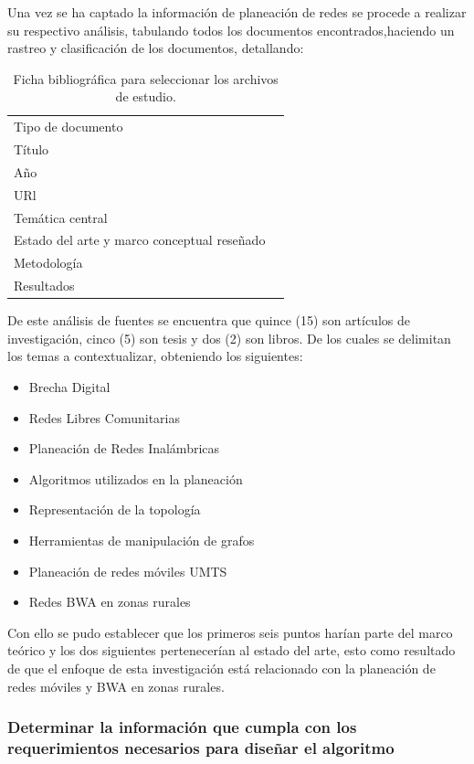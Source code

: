 \documentclass[]{article}
\providecommand{\tightlist}{%
  \setlength{\itemsep}{0pt}\setlength{\parskip}{0pt}}
\begin{document}
Una vez se ha captado la información de planeación de redes se procede a
realizar su respectivo análisis, tabulando todos los documentos
encontrados,haciendo un rastreo y clasificación de los documentos,
detallando:

\begin{longtable}[]{@{}ll@{}}
\caption{Ficha bibliográfica para seleccionar los archivos de
estudio.}\tabularnewline
\toprule
Tipo de documento &\tabularnewline
Título &\tabularnewline
Año &\tabularnewline
URl &\tabularnewline
Temática central &\tabularnewline
Estado del arte y marco conceptual reseñado &\tabularnewline
Metodología &\tabularnewline
Resultados &\tabularnewline
\bottomrule
\end{longtable}

De este análisis de fuentes se encuentra que quince (15) son artículos
de investigación, cinco (5) son tesis y dos (2) son libros. De los
cuales se delimitan los temas a contextualizar, obteniendo los
siguientes:

\begin{itemize}
\tightlist
\item
  Brecha Digital
\item
  Redes Libres Comunitarias
\item
  Planeación de Redes Inalámbricas
\item
  Algoritmos utilizados en la planeación
\item
  Representación de la topología
\item
  Herramientas de manipulación de grafos
\item
  Planeación de redes móviles UMTS
\item
  Redes BWA en zonas rurales
\end{itemize}

Con ello se pudo establecer que los primeros seis puntos harían parte
del marco teórico y los dos siguientes pertenecerían al estado del arte,
esto como resultado de que el enfoque de esta investigación está
relacionado con la planeación de redes móviles y BWA en zonas rurales.

\subsubsection{\texorpdfstring{\textbf{Determinar la información que
cumpla con los requerimientos necesarios para diseñar el
algoritmo}}{Determinar la información que cumpla con los requerimientos necesarios para diseñar el algoritmo}}\label{determinar-la-informaciuxf3n-que-cumpla-con-los-requerimientos-necesarios-para-diseuxf1ar-el-algoritmo}
\end{document}
